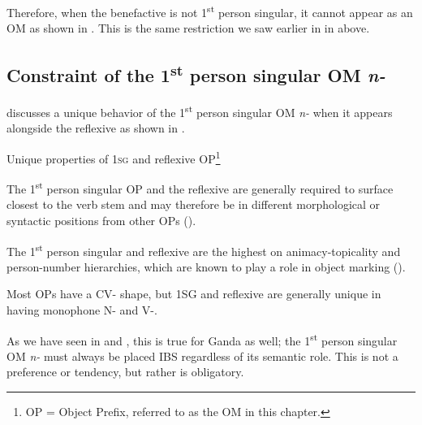 \documentclass[output=paper,
            colorlinks, citecolor=brown
            ,draftmode
		  ]{langscibook}
\begin{document}
Therefore, when the benefactive is not 1\textsuperscript{st} person singular, it cannot appear as an OM as shown in . This is the same restriction we saw earlier in  in  above. 

\ea%
    \label{ex:yoneda:54}
    \z
\z

\subsection{Constraint of the 1\textsuperscript{st} person singular OM \textit{n-}}     
\label{sec:yoneda:4.3}

\citet{Marlo2014} discusses a unique behavior of the 1\textsuperscript{st} person singular OM \textit{n-} when it appears alongside the reflexive as shown in .

\ea\label{ex:yoneda:55} Unique properties of 1\textsc{sg} and reflexive OP\footnote{OP = Object Prefix, referred to as the OM in this chapter.} \citep[5]{Marlo2014}

\ea\label{ex:yoneda:55a}
The 1\textsuperscript{st} person singular OP and the reflexive are generally required to surface closest to the verb stem \citep[297]{Polak1983} and may therefore be in different morphological or syntactic positions from other OPs (\citealt{Buell2005, Muriungi2008}). 

\ex \label{ex:yoneda:55b}
The 1\textsuperscript{st} person singular and reflexive are the highest on animacy-topicality and person-number hierarchies, which are known to play a role in object marking (\citealt{Alsina1994, Contini-Morava1983, Duranti1979, Rugemalira1993obj}). 

\ex \label{ex:yoneda:55c}
Most OPs have a CV- shape, but 1SG and reflexive are generally unique in having monophone N- and V-.
\z
\z

As we have seen in  and , this is true for Ganda as well; the 1\textsuperscript{st} person singular OM \textit{n-} must always be placed IBS regardless of its semantic role. This is not a preference or tendency, but rather is obligatory. 
\end{document}
